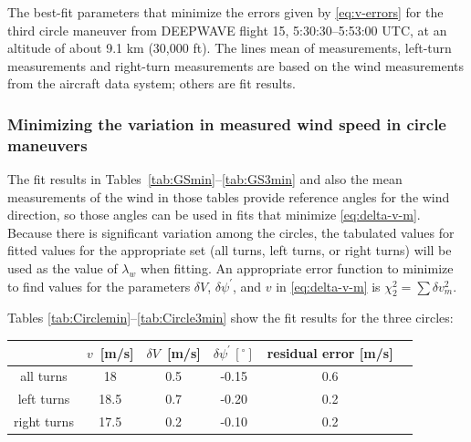 \documentclass[12pt,twoside,english]{article}\usepackage[]{graphicx}\usepackage[]{color}
\providecommand{\tabularnewline}{\\}
\let\OrgIndex\index
\renewcommand*{\index}[1]{\OrgIndex{#1}}
\begin{document}
{{\begin{center}
\begin{table}[H]
\protect\caption[The best-fit parameters that minimize the errors given by \eqref{eq:v-errors} for the third circle maneuver from DEEPWAVE flight 15.]{The best-fit parameters that minimize the errors given by \eqref{eq:v-errors} for the third circle maneuver from DEEPWAVE flight 15, 5:30:30--5:53:00 UTC, at an altitude of about 9.1 km (30,000 ft). The lines \textquotedbl{}mean of measurements\textquotedbl{}, \textquotedbl{}left-turn measurements\textquotedbl{} and \textquotedbl{}right-turn measurements\textquotedbl{} are based on the wind measurements from the aircraft data system; others are fit results.\label{tab:GS3min}}
\end{table}

\par\end{center}



\subsubsection{Minimizing the variation in measured wind speed in circle maneuvers\label{WS-var-circles}}

The fit results in Tables~\ref{tab:GSmin}--\ref{tab:GS3min} and also the mean measurements of the wind in those tables provide reference angles for the wind direction, so those angles can be used in fits that minimize \eqref{eq:delta-v-m}. Because there is significant variation among the circles, the tabulated values for fitted values for the appropriate set (all turns, left turns, or right turns) will be used as the value of $\lambda_w$ when fitting. An appropriate error function to minimize to find values for the parameters $\delta V$, $\delta\psi^{\prime}$, and $v$ in \eqref{eq:delta-v-m} is $\chi_{2}^{2}=\sum{\delta v_{m}^{2}}$. 

Tables \ref{tab:Circlemin}--\ref{tab:Circle3min} show the fit results for the three circles: 

\begin{center}
\begin{table}[H] 
\begin{centering}
\begin{tabular}{cccccc}
\toprule   & $v$~{[}m/s{]}  & $\delta V$~{[}m/s{]}  & $\delta\psi^{\prime}\,[^{\circ}]$  & residual error {[}m/s{]} & \tabularnewline 
\midrule 
\midrule  all turns  & 18 & 0.5 & -0.15 & 0.6\tabularnewline 
\midrule  left turns & 18.5 & 0.7 & -0.20 & 0.2\tabularnewline 
\midrule  right turns &  17.5 & 0.2 & -0.10 & 0.2\tabularnewline 
\bottomrule 
\end{tabular}
\par\end{centering}


\end{table}
\end{center}}}
\end{document}
